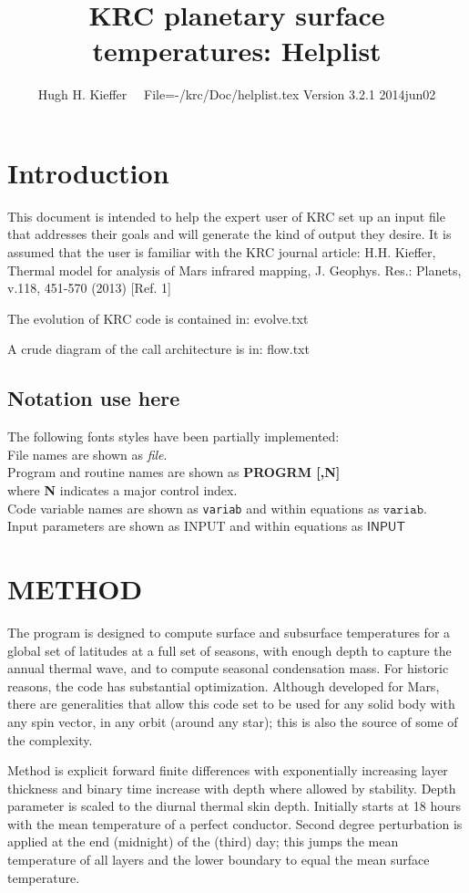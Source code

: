 \documentclass[draft]{article}  %
\title{KRC planetary surface temperatures: Helplist}
\author{Hugh H. Kieffer  \ \ File=-/krc/Doc/helplist.tex Version 3.2.1 2014jun02}
\newcommand{\qi}{\\ \hspace*{2.em}}      %
\newcommand{\qii}{\\ \hspace*{4.em}}     %
\newcommand{\np}{\textbf}  %
\newcommand{\nf}{\textit}  %
\newcommand{\nv}{\texttt}  %
\newcommand{\nvf}{\mathtt} %
\newcommand{\nj}{\textsf}  %
\newcommand{\njf}{\mathsf} %
\begin{document}
\maketitle

\tableofcontents


\section{Introduction} %

This document is intended to help the expert user of KRC set up an input file
that addresses their goals and will generate the kind of output they desire. It
is assumed that the user is familiar with the KRC journal article: H.H. Kieffer,
Thermal model for analysis of Mars infrared mapping, J. Geophys. Res.: Planets, v.118, 451-570 (2013) [Ref. 1]

The evolution of KRC code is contained in:  evolve.txt 

A crude diagram of the call architecture is in:  flow.txt 

\subsection{Notation use here}
The following fonts styles have been partially implemented: 
\qi File names are shown as \nf{file}. 
\qi Program and routine names are shown as \np{PROGRM [,N]} 
\qii where \np{N} indicates a major control index. 
\qi Code variable names are shown as \nv{variab} and within equations as $\nvf{variab}$.  
\qi Input parameters are shown as \nj{INPUT} and within equations as $\njf{INPUT}$


\section{METHOD}

The program is designed to compute surface and subsurface temperatures for a
global set of latitudes at a full set of seasons, with enough depth to capture
the annual thermal wave, and to compute seasonal condensation mass. For historic
reasons, the code has substantial optimization. Although developed for Mars,
there are generalities that allow this code set to be used for any solid body
with any spin vector, in any orbit (around any star); this is also the source of
some of the complexity.
 
Method is explicit forward finite differences with exponentially increasing
layer thickness and binary time increase with depth where allowed by stability.
Depth parameter is scaled to the diurnal thermal skin depth.  Initially starts
at 18 hours with the mean temperature of a perfect conductor.  Second degree
perturbation is applied at the end (midnight) of the (third) day; this jumps the
mean temperature of all layers and the lower boundary to equal the mean surface
temperature.
\end{document}
